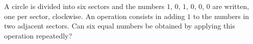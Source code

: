 A circle is divided into six sectors and the numbers $1$, $0$, $1$, $0$, $0$, $0$ are written, one per sector, clockwise. An operation consists in adding $1$ to the numbers in two adjacent sectors. Can six equal numbers be obtained by applying this operation repeatedly?
